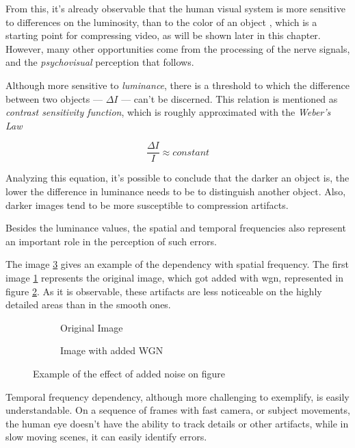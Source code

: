 From this, it's already observable that the human visual system is more sensitive to differences on the luminosity, than to the color of an object \cite{mullenContrastSensitivityHuman1985}, which is a starting point for compressing video, as will be shown later in this chapter. However, many other opportunities come from the processing of the nerve signals, and the \emph{psychovisual} perception that follows.

Although more sensitive to \emph{luminance}, there is a threshold to which the difference between two objects --- $\Delta I$ --- can't be discerned. This relation is mentioned as \emph{contrast sensitivity function}, which is roughly approximated with the \emph{Weber's Law}

\begin{equation}
    \frac{\Delta I}{I}\approx constant
\end{equation}

Analyzing this equation, it's possible to conclude that the darker an object is, the lower the difference in luminance needs to be to distinguish another object. Also, darker images tend to be more susceptible to compression artifacts.

Besides the luminance values, the spatial and temporal frequencies also represent an important role in the perception of such errors. 

The image \ref{fig:noise} gives an example of the dependency with spatial frequency. The first image \ref{subfig:noiseOri} represents the original image, which got added with \gls{wgn}, represented in figure \ref{subfig:noise}. As it is observable, these artifacts are less noticeable on the highly detailed areas than in the smooth ones.

\begin{figure}[h]
    \centering
    \begin{subfigure}[c]{\textwidth}
        \centering
        \caption{Original Image}
        \label{subfig:noiseOri}
    \end{subfigure}
    \begin{subfigure}[c]{\textwidth}
        \centering
        \caption{Image with added WGN}
        \label{subfig:noise}
    \end{subfigure}
    \caption{Example of the effect of added noise on figure}
    \label{fig:noise}
\end{figure}

Temporal frequency dependency, although more challenging to exemplify, is easily understandable. On a sequence of frames with fast camera, or subject movements, the human eye doesn't have the ability to track details or other artifacts, while in slow moving scenes, it can easily identify errors.

